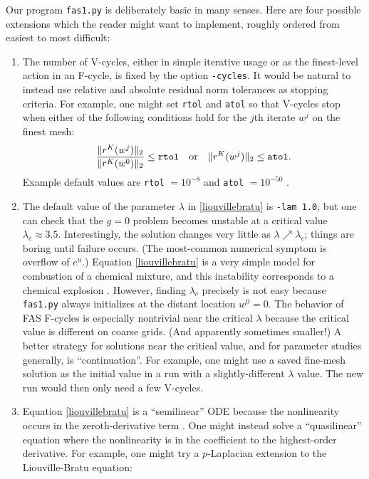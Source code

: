 \documentclass[letterpaper,final,12pt,reqno]{amsart}
\begin{document}
Our program \texttt{fas1.py} is deliberately basic in many senses.  Here are four possible extensions which the reader might want to implement, roughly ordered from easiest to most difficult:
\renewcommand{\labelenumi}{\textbf{\Roman{enumi}.}}
\begin{enumerate}
\item The number of V-cycles, either in simple iterative usage or as the finest-level action in an F-cycle, is fixed by the option \texttt{-cycles}.  It would be natural to instead use relative and absolute residual norm tolerances as stopping criteria.  For example, one might set \texttt{rtol} and \texttt{atol} so that V-cycles stop when either of the following conditions hold for the $j$th iterate $w^j$ on the finest mesh:
    $$\frac{\|r^K(w^j)\|_2}{\|r^K(w^0)\|_2} \le \text{\texttt{rtol}} \quad \text{or} \quad \|r^K(w^j)\|_2 \le \text{\texttt{atol}}.$$
Example default values are \texttt{rtol} $=10^{-8}$ and \texttt{atol} $=10^{-50}$ \cite{Bueler2021}.
\item The default value of the parameter $\lambda$ in \eqref{liouvillebratu} is \texttt{-lam 1.0}, but one can check that the $g=0$ problem becomes unstable at a critical value $\lambda_c \approx 3.5$.  Interestingly, the solution changes very little as $\lambda \nearrow \lambda_c$; things are boring until failure occurs.  (The most-common numerical symptom is overflow of $e^u$.)  Equation \eqref{liouvillebratu} is a very simple model for combustion of a chemical mixture, and this instability corresponds to a chemical explosion \cite{FrankKameneckij1955}.  However, finding $\lambda_c$ precisely is not easy because \texttt{fas1.py} always initializes at the distant location $w^0=0$.  The behavior of FAS F-cycles is especially nontrivial near the critical $\lambda$ because the critical value is different on coarse grids.  (And apparently sometimes smaller!)  A better strategy for solutions near the critical value, and for parameter studies generally, is ``continuation''.  For example, one might use a saved fine-mesh solution as the initial value in a run with a slightly-different $\lambda$ value.  The new run would then only need a few V-cycles.
\item Equation \eqref{liouvillebratu} is a ``semilinear'' ODE because the nonlinearity occurs in the zeroth-derivative term \cite{Evans2010}.  One might instead solve a ``quasilinear'' equation where the nonlinearity is in the coefficient to the highest-order derivative.  For example, one might try a $p$-Laplacian \cite{Evans2010} extension to the Liouville-Bratu equation:

\end{enumerate}
\end{document}
